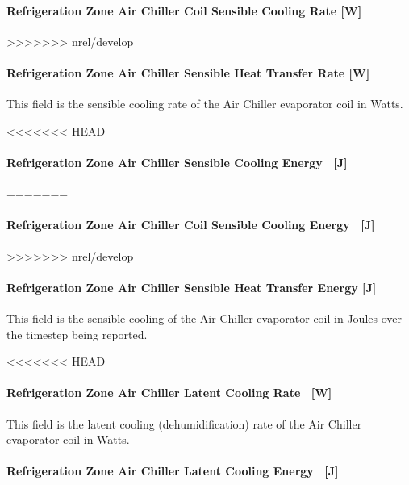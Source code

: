 \paragraph{Refrigeration Zone Air Chiller Coil Sensible Cooling Rate {[}W{]}}\label{refrigeration-zone-air-chiller-coil-sensible-cooling-rate-w-1}
>>>>>>> nrel/develop

\paragraph{Refrigeration Zone Air Chiller Sensible Heat Transfer Rate {[}W{]}}\label{refrigeration-zone-air-chiller-sensible-heat-transfer-rate-w-1}

This field is the sensible cooling rate of the Air Chiller evaporator coil in Watts.

<<<<<<< HEAD
\paragraph{Refrigeration Zone Air Chiller Sensible Cooling Energy ~{[}J{]}}\label{refrigeration-zone-air-chiller-sensible-cooling-energy-j}
=======
\paragraph{Refrigeration Zone Air Chiller Coil Sensible Cooling Energy ~{[}J{]}}\label{refrigeration-zone-air-chiller-coil-sensible-cooling-energy-j}
>>>>>>> nrel/develop

\paragraph{Refrigeration Zone Air Chiller Sensible Heat Transfer Energy {[}J{]}}\label{refrigeration-zone-air-chiller-sensible-heat-transfer-energy-j-1}

This field is the sensible cooling of the Air Chiller evaporator coil in Joules over the timestep being reported.

<<<<<<< HEAD
\paragraph{Refrigeration Zone Air Chiller Latent Cooling Rate ~{[}W{]}}\label{refrigeration-zone-air-chiller-latent-cooling-rate-w-1}

This field is the latent cooling (dehumidification) rate of the Air Chiller evaporator coil in Watts.

\paragraph{Refrigeration Zone Air Chiller Latent Cooling Energy ~{[}J{]}}\label{refrigeration-zone-air-chiller-latent-cooling-energy-j}

